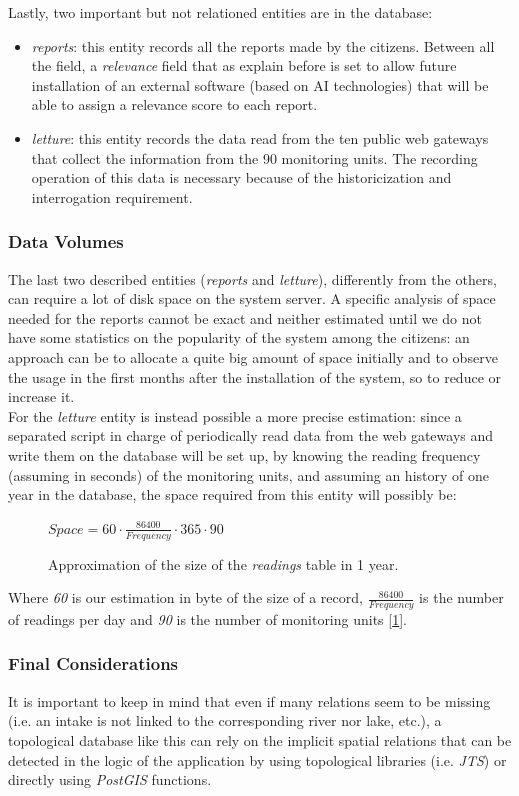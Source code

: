Lastly, two important but not relationed entities are in the database:
\begin{itemize}
    \item \textit{reports}: this entity records all the reports made by the citizens. Between all the field, a \textit{relevance} field that as explain before is set to allow future installation of an external software (based on AI technologies) that will be able to assign a relevance score to each report.
    \item \textit{letture}: this entity records the data read from the ten public web gateways that collect the information from the 90 monitoring units. The recording operation of this data is necessary because of the historicization and interrogation requirement.
\end{itemize}

\subsubsection{Data Volumes}
The last two described entities (\textit{reports} and \textit{letture}), differently from the others, can require a lot of disk space on the system server.
A specific analysis of space needed for the reports cannot be exact and neither estimated until we do not have some statistics on the popularity of the system among the citizens: an approach can be to allocate a quite big amount of space initially and to observe the usage in the first months after the installation of the system, so to reduce or increase it. \\
For the \textit{letture} entity is instead possible a more precise estimation: since a separated script in charge of periodically read data from the web gateways and write them on the database will be set up, by knowing the reading frequency (assuming in seconds) of the monitoring units, and assuming an history of one year in the database, the space required from this entity will possibly be: \\
\begin{figure}[H]
    \centering
    \begin{math}
        Space = 60\cdot\frac{86400}{Frequency}\cdot365\cdot90
    \end{math}
    \caption{Approximation of the size of the \textit{readings} table in 1 year.}
    \label{letture_space}
\end{figure}
Where \textit{60} is our estimation in byte of the size of a record, \(\frac{86400}{Frequency}\) is the number of readings per day and \textit{90} is the number of monitoring units [\ref{letture_space}].
   
\subsubsection{Final Considerations}
It is important to keep in mind that even if many relations seem to be missing (i.e. an intake is not linked to the corresponding river nor lake, etc.), a topological database like this can rely on the implicit spatial relations that can be detected in the logic of the application by using topological libraries (i.e. \textit{JTS}) or directly using \textit{PostGIS} functions.